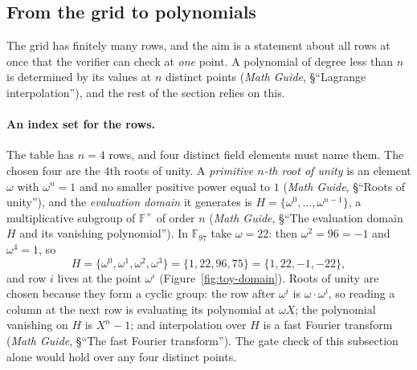 \documentclass[11pt,a4paper]{article}
\theoremstyle{definition}
\newcommand{\F}{\mathbb{F}}
\begin{document}
\subsection{From the grid to polynomials}
\label{sec:arith-polys}

The grid has finitely many rows, and the aim is a statement about all rows
at once that the verifier can check at \emph{one} point. A polynomial of
degree less than $n$ is determined by its values at $n$ distinct points
(\emph{Math Guide}, \S``Lagrange interpolation''), and the rest of the
section relies on this.

\paragraph{An index set for the rows.}
The table has $n = 4$ rows, and four distinct field elements must name
them. The chosen four are the $4$th roots of unity. A \emph{primitive
$n$-th root of unity} is an element $\omega$ with $\omega^n = 1$ and no
smaller positive power equal to $1$ (\emph{Math Guide}, \S``Roots of
unity''), and the \emph{evaluation domain} it generates is
$H = \{\omega^0, \dots, \omega^{n-1}\}$, a multiplicative subgroup of
$\F^\times$ of order $n$ (\emph{Math Guide}, \S``The evaluation domain $H$
and its vanishing polynomial''). In $\F_{97}$ take $\omega = 22$: then
$\omega^2 = 96 = -1$ and $\omega^4 = 1$, so
\[
H = \{\omega^0, \omega^1, \omega^2, \omega^3\} = \{1, 22, 96, 75\}
  = \{1, 22, -1, -22\},
\]
and row $i$ lives at the point $\omega^i$ (Figure~\ref{fig:toy-domain}).
Roots of unity are chosen
because they form a cyclic group: the row after $\omega^i$ is
$\omega \cdot \omega^i$, so reading a column at the next row is evaluating
its polynomial at $\omega X$; the polynomial vanishing on $H$ is
$X^n - 1$; and interpolation over $H$ is a fast Fourier transform
(\emph{Math Guide}, \S``The fast Fourier transform''). The gate check of
this subsection alone would hold over any four distinct points.
\end{document}
